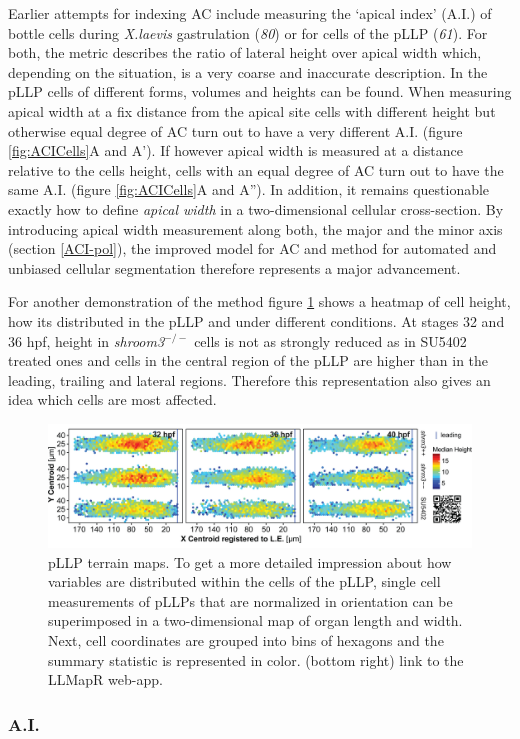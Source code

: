 \documentclass[11pt,singlespacinge,twoside]{reedthesis} %
\theoremstyle{definition}
\theoremstyle{definition}
\theoremstyle{definition}
\theoremstyle{remark}
\begin{document}
Earlier attempts for indexing AC include measuring the `apical index' (A.I.) of bottle cells during \emph{X.laevis} gastrulation (\emph{80}) or for cells of the pLLP (\emph{61}). For both, the metric describes the ratio of lateral height over apical width which, depending on the situation, is a very coarse and inaccurate description. In the pLLP cells of different forms, volumes and heights can be found. When measuring apical width at a fix distance from the apical site cells with different height but otherwise equal degree of AC turn out to have a very different A.I. (figure \ref{fig:ACICells}A and A'). If however apical width is measured at a distance relative to the cells height, cells with an equal degree of AC turn out to have the same A.I. (figure \ref{fig:ACICells}A and A''). In addition, it remains questionable exactly how to define \emph{apical width} in a two-dimensional cellular cross-section. By introducing apical width measurement along both, the major and the minor axis (section \ref{ACI-pol}), the improved model for AC and method for automated and unbiased cellular segmentation therefore represents a major advancement.

For another demonstration of the method figure \ref{fig:dismap} shows a heatmap of cell height, how its distributed in the pLLP and under different conditions. At stages 32 and 36 hpf, height in \emph{shroom3}\(^{-/-}\) cells is not as strongly reduced as in SU5402 treated ones and cells in the central region of the pLLP are higher than in the leading, trailing and lateral regions. Therefore this representation also gives an idea which cells are most affected.


\begin{figure}[H]

{\centering \includegraphics[width=0.95\linewidth]{figures/summary/methodology_mapr} 

}

\caption[pLLP Maps]{pLLP terrain maps. To get a more detailed impression about how variables are distributed within the cells of the pLLP, single cell measurements of pLLPs that are normalized in orientation can be superimposed in a two-dimensional map of organ length and width. Next, cell coordinates are grouped into bins of hexagons and the summary statistic is represented in color. (bottom right) link to the LLMapR web-app.}\label{fig:dismap}
\end{figure}
\hypertarget{res-ai}{%
\subsubsection{A.I.}\label{res-ai}}
\end{document}
